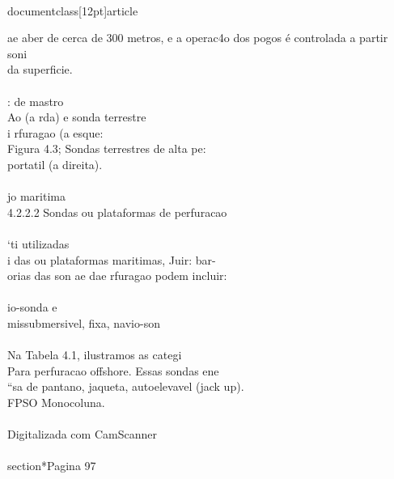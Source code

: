 \\documentclass[12pt]{article}
\begin{document}
ae aber de cerca de 300 metros, e a operac4o dos pogos é controlada a partir\\
soni\\
da superficie.\\
\\
: de mastro\\
Ao (a rda) e sonda terrestre\\
i rfuragao (a esque:\\
Figura 4.3; Sondas terrestres de alta pe:\\
portatil (a direita).\\
\\
jo maritima\\
4.2.2.2 Sondas ou plataformas de perfuracao\\
\\
‘ti utilizadas\\
i das ou plataformas maritimas, Juir: bar-\\
orias das son ae dae rfuragao podem incluir:\\
\\
io-sonda e\\
missubmersivel, fixa, navio-son\\
\\
Na Tabela 4.1, ilustramos as categi\\
Para perfuracao offshore. Essas sondas ene\\
“sa de pantano, jaqueta, autoelevavel (jack up).\\
FPSO Monocoluna.\\
\\
Digitalizada com CamScanner\\

\\section*{Pagina 97}
\end{document}
